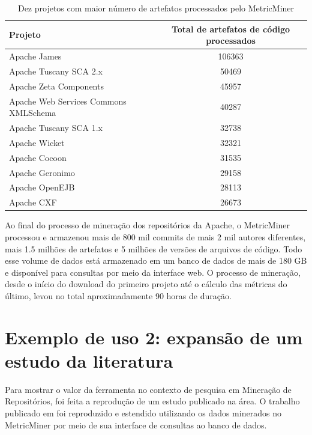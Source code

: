 \documentclass[a4paper, 12pt, twoside]{book}
\begin{document}
        \begin{table}\begin{center}
        \begin{tabular}{| p{6cm} | c |}
            \hline                        
            \textbf{Projeto} & \textbf{Total de artefatos de código processados} \\
            \hline
            Apache James & 106363 \\
            \hline
            Apache Tuscany SCA 2.x & 50469 \\
            \hline
            Apache Zeta Components & 45957\\
            \hline
            Apache Web Services Commons XMLSchema & 40287 \\
            \hline
            Apache Tuscany SCA 1.x & 32738 \\
            \hline
            Apache Wicket & 32321 \\
            \hline
            Apache Cocoon & 31535 \\
            \hline
            Apache Geronimo & 29158 \\
            \hline
            Apache OpenEJB & 28113 \\
            \hline
            Apache CXF & 26673 \\
            \hline
        \end{tabular}
        \caption{Dez projetos com maior número de artefatos processados pelo MetricMiner \label{tab:artefatos}}
        \end{center}\end{table}

        Ao final do processo de mineração dos repositórios da Apache, o MetricMiner processou e armazenou mais de 800 mil commits de mais 2 mil autores diferentes, mais 1.5 milhões de artefatos e 5 milhões de versões de arquivos de código. Todo esse volume de dados está armazenado em um banco de dados de mais de 180 GB e disponível para consultas por meio da interface web. O processo de mineração, desde o início do download do primeiro projeto até o cálculo das métricas do último, levou no total aproximadamente 90 horas de duração.

    \section{Exemplo de uso 2: expansão de um estudo da literatura} \label{sc:estudo-caso}
        Para mostrar o valor da ferramenta no contexto de pesquisa em Mineração de Repositórios, foi feita a reprodução de um estudo publicado na área. O trabalho publicado em \cite{SoetensQUATIC2010} foi reproduzido e estendido utilizando os dados minerados no MetricMiner por meio de sua interface de consultas ao banco de dados.
\end{document}
